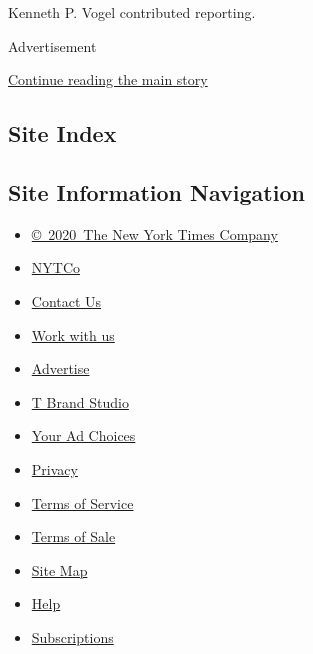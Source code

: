 Kenneth P. Vogel contributed reporting.

Advertisement

\protect\hyperlink{after-bottom}{Continue reading the main story}

\hypertarget{site-index}{%
\subsection{Site Index}\label{site-index}}

\hypertarget{site-information-navigation}{%
\subsection{Site Information
Navigation}\label{site-information-navigation}}

\begin{itemize}
\tightlist
\item
  \href{https://help.nytimes.com/hc/en-us/articles/115014792127-Copyright-notice}{©~2020~The
  New York Times Company}
\end{itemize}

\begin{itemize}
\tightlist
\item
  \href{https://www.nytco.com/}{NYTCo}
\item
  \href{https://help.nytimes.com/hc/en-us/articles/115015385887-Contact-Us}{Contact
  Us}
\item
  \href{https://www.nytco.com/careers/}{Work with us}
\item
  \href{https://nytmediakit.com/}{Advertise}
\item
  \href{http://www.tbrandstudio.com/}{T Brand Studio}
\item
  \href{https://www.nytimes.com/privacy/cookie-policy\#how-do-i-manage-trackers}{Your
  Ad Choices}
\item
  \href{https://www.nytimes.com/privacy}{Privacy}
\item
  \href{https://help.nytimes.com/hc/en-us/articles/115014893428-Terms-of-service}{Terms
  of Service}
\item
  \href{https://help.nytimes.com/hc/en-us/articles/115014893968-Terms-of-sale}{Terms
  of Sale}
\item
  \href{https://spiderbites.nytimes.com}{Site Map}
\item
  \href{https://help.nytimes.com/hc/en-us}{Help}
\item
  \href{https://www.nytimes.com/subscription?campaignId=37WXW}{Subscriptions}
\end{itemize}
